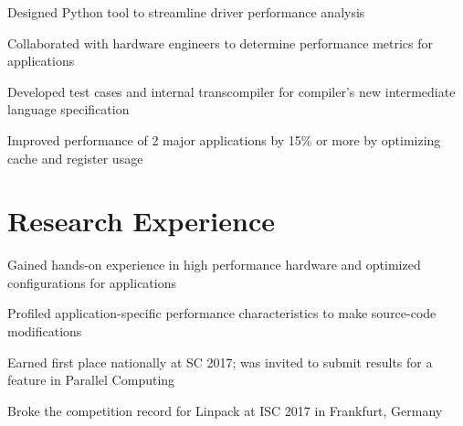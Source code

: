 \documentclass[]{resume-style}
\begin{document}
\vspace{2mm}
\vspace{0.65mm}
\vspace{1.28mm}
\begin{tightemize}
\item Designed Python tool to streamline driver performance analysis
\item Collaborated with hardware engineers to determine performance metrics for applications
\item Developed test cases and internal transcompiler for compiler's new intermediate language specification
\item Improved performance of 2 major applications by 15\% or more by optimizing cache and register usage%
\end{tightemize}

\vspace{-0.7mm}
\section{\hfill Research Experience \hfill}

\vspace{0.138mm}
\vspace{1.25mm}
\begin{tightemize}
\item Gained hands-on experience in high performance hardware and optimized configurations for applications
\item Profiled application-specific performance characteristics to make source-code modifications
\item Earned first place nationally at SC 2017; was invited to submit results for a feature in Parallel Computing
\item Broke the competition record for Linpack at ISC 2017 in Frankfurt, Germany
\end{tightemize}
\end{document}
